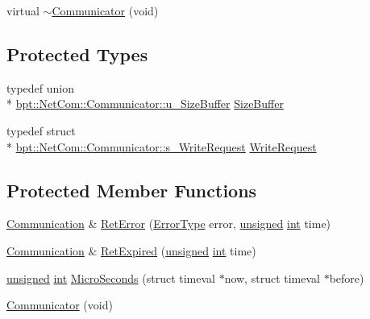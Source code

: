 \begin{DoxyCompactItemize}
\item 
virtual \hyperlink{classbpt_1_1_net_com_1_1_communicator_a3adcf38174a6137b3a30c97aa85dbb8b}{$\sim$\-Communicator} (void)
\end{DoxyCompactItemize}
\subsection*{Protected Types}
\begin{DoxyCompactItemize}
\item 
typedef union \\*
\hyperlink{unionbpt_1_1_net_com_1_1_communicator_1_1u___size_buffer}{bpt\-::\-Net\-Com\-::\-Communicator\-::u\-\_\-\-Size\-Buffer} \hyperlink{classbpt_1_1_net_com_1_1_communicator_ad3c27ccd1f2a96ae2a958e92d01de58d}{Size\-Buffer}
\item 
typedef struct \\*
\hyperlink{structbpt_1_1_net_com_1_1_communicator_1_1s___write_request}{bpt\-::\-Net\-Com\-::\-Communicator\-::s\-\_\-\-Write\-Request} \hyperlink{classbpt_1_1_net_com_1_1_communicator_acf7d4d13d65749b0a202776c587c3502}{Write\-Request}
\end{DoxyCompactItemize}
\subsection*{Protected Member Functions}
\begin{DoxyCompactItemize}
\item 
\hyperlink{namespacebpt_1_1_net_com_af30d27373a967c6e6bcbf97963e2ab1d}{Communication} \& \hyperlink{classbpt_1_1_net_com_1_1_communicator_abc6b4ebe083f939b3a095dd83352690b}{Ret\-Error} (\hyperlink{namespacebpt_1_1_net_com_a401866ee6997493e98c7823af2d1bca6}{Error\-Type} error, \hyperlink{curses_8priv_8h_aca40206900cfc164654362fa8d4ad1e6}{unsigned} \hyperlink{term__entry_8h_ad65b480f8c8270356b45a9890f6499ae}{int} time)
\item 
\hyperlink{namespacebpt_1_1_net_com_af30d27373a967c6e6bcbf97963e2ab1d}{Communication} \& \hyperlink{classbpt_1_1_net_com_1_1_communicator_a21cf69159d769207cb2cb1b7a72ebeb4}{Ret\-Expired} (\hyperlink{curses_8priv_8h_aca40206900cfc164654362fa8d4ad1e6}{unsigned} \hyperlink{term__entry_8h_ad65b480f8c8270356b45a9890f6499ae}{int} time)
\item 
\hyperlink{curses_8priv_8h_aca40206900cfc164654362fa8d4ad1e6}{unsigned} \hyperlink{term__entry_8h_ad65b480f8c8270356b45a9890f6499ae}{int} \hyperlink{classbpt_1_1_net_com_1_1_communicator_a50e0ebee32c2b67614763f7f5ab28c38}{Micro\-Seconds} (struct timeval $\ast$now, struct timeval $\ast$before)
\item 
\hyperlink{classbpt_1_1_net_com_1_1_communicator_abd8016a445d3851039c34125965e1606}{Communicator} (void)
\end{DoxyCompactItemize}
